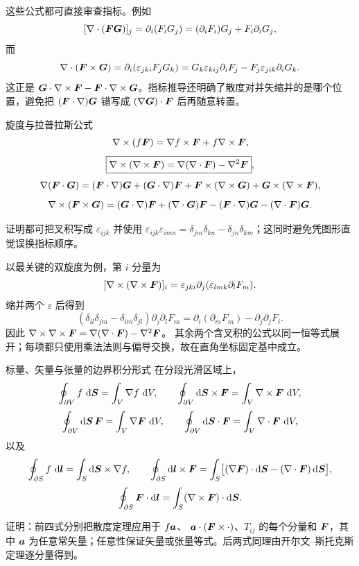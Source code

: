 这些公式都可直接审查指标。例如
\[
 [\nabla\cdot(\bm{F}\bm{G})]_j
 =\partial_i(F_iG_j)=(\partial_iF_i)G_j+F_i\partial_iG_j,
\]
而
\[
 \nabla\cdot(\bm{F}\times\bm{G})
 =\partial_i(\varepsilon_{jki}F_jG_k)
 =G_k\varepsilon_{kij}\partial_iF_j
 -F_j\varepsilon_{jik}\partial_iG_k.
\]
这正是 $\bm{G}\cdot\nabla\times\bm{F}-\bm{F}\cdot\nabla\times\bm{G}$。指标推导还明确了散度对并矢缩并的是哪个位置，避免把 $(\bm{F}\cdot\nabla)\bm{G}$ 错写成 $(\nabla\bm{G})\cdot\bm{F}$ 后再随意转置。

\begin{advtheorem}{旋度与拉普拉斯公式}\label{advA3:thm:curl-rules}
\[
 \nabla\times(f\bm{F})=\nabla f\times\bm{F}+f\nabla\times\bm{F},
\]
\[
 \boxed{\nabla\times(\nabla\times\bm{F})
 =\nabla(\nabla\cdot\bm{F})-\nabla^2\bm{F}},
\]
\[
 \nabla(\bm{F}\cdot\bm{G})
 =(\bm{F}\cdot\nabla)\bm{G}+(\bm{G}\cdot\nabla)\bm{F}
 +\bm{F}\times(\nabla\times\bm{G})
 +\bm{G}\times(\nabla\times\bm{F}),
\]
\[
 \nabla\times(\bm{F}\times\bm{G})
 =(\bm{G}\cdot\nabla)\bm{F}+(\nabla\cdot\bm{G})\bm{F}
 -(\bm{F}\cdot\nabla)\bm{G}-(\nabla\cdot\bm{F})\bm{G}.
\]
\end{advtheorem}
证明都可把叉积写成 $\varepsilon_{ijk}$ 并使用
$\varepsilon_{ijk}\varepsilon_{imn}=\delta_{jm}\delta_{kn}-\delta_{jn}\delta_{km}$；这同时避免凭图形直觉误换指标顺序。

以最关键的双旋度为例，第 $i$ 分量为
\[
 [\nabla\times(\nabla\times\bm{F})]_i
 =\varepsilon_{jki}\partial_j
 (\varepsilon_{lmk}\partial_lF_m).
\]
缩并两个 $\varepsilon$ 后得到
\[
 (\delta_{il}\delta_{jm}-\delta_{im}\delta_{jl})
 \partial_j\partial_lF_m
 =\partial_i(\partial_mF_m)-\partial_j\partial_jF_i.
\]
因此
$\nabla\times\nabla\times\bm{F}=\nabla(\nabla\cdot\bm{F})-\nabla^2\bm{F}$。
其余两个含叉积的公式以同一恒等式展开；每项都只使用乘法法则与偏导交换，故在直角坐标固定基中成立。

\begin{advtheorem}{标量、矢量与张量的边界积分形式}\label{advA3:thm:boundary-integrals}
在分段光滑区域上，
\[
 \oint_{\partial V}f\,\mathop{}\!\mathrm d\bm{S}=\int_V\nabla f\,\mathop{}\!\mathrm d V,
 \qquad
 \oint_{\partial V}\mathop{}\!\mathrm d\bm{S}\times\bm{F}
 =\int_V\nabla\times\bm{F}\,\mathop{}\!\mathrm d V,
\]
\[
 \oint_{\partial V}\mathop{}\!\mathrm d\bm{S}\,\bm{F}
 =\int_V\nabla\bm{F}\,\mathop{}\!\mathrm d V,
 \qquad
 \oint_{\partial V}\mathop{}\!\mathrm d\bm{S}\cdot\bm{F}
 =\int_V\nabla\cdot\bm{F}\,\mathop{}\!\mathrm d V,
\]
以及
\[
 \oint_{\partial S}f\,\mathop{}\!\mathrm d\bm{l}
 =\int_S\mathop{}\!\mathrm d\bm{S}\times\nabla f,
 \qquad
 \oint_{\partial S}\mathop{}\!\mathrm d\bm{l}\times\bm{F}
 =\int_S\bigl[(\nabla\bm{F})\cdot\mathop{}\!\mathrm d\bm{S}
 -(\nabla\cdot\bm{F})\mathop{}\!\mathrm d\bm{S}\bigr],
 \]
\[
 \oint_{\partial S}\bm{F}\cdot\mathop{}\!\mathrm d\bm{l}
 =\int_S(\nabla\times\bm{F})\cdot\mathop{}\!\mathrm d\bm{S}.
\]
\end{advtheorem}
证明：前四式分别把散度定理应用于 $f\bm{a}$、
$\bm{a}\cdot(\bm{F}\times\cdot)$、$T_{ij}$ 的每个分量和 $\bm{F}$，其中 $\bm{a}$ 为任意常矢量；任意性保证矢量或张量等式。后两式同理由开尔文--斯托克斯定理逐分量得到。


